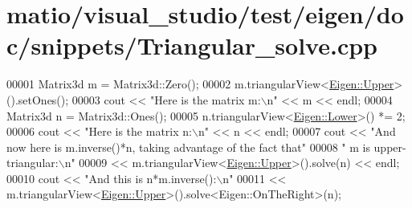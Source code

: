 \hypertarget{matio_2visual__studio_2test_2eigen_2doc_2snippets_2_triangular__solve_8cpp_source}{}\section{matio/visual\+\_\+studio/test/eigen/doc/snippets/\+Triangular\+\_\+solve.cpp}
\label{matio_2visual__studio_2test_2eigen_2doc_2snippets_2_triangular__solve_8cpp_source}

\begin{DoxyCode}
00001 Matrix3d m = Matrix3d::Zero();
00002 m.triangularView<\hyperlink{group__enums_gga39e3366ff5554d731e7dc8bb642f83cda6bcb58be3b8b8ec84859ce0c5ac0aaec}{Eigen::Upper}>().setOnes();
00003 cout << \textcolor{stringliteral}{"Here is the matrix m:\(\backslash\)n"} << m << endl;
00004 Matrix3d n = Matrix3d::Ones();
00005 n.triangularView<\hyperlink{group__enums_gga39e3366ff5554d731e7dc8bb642f83cda891792b8ed394f7607ab16dd716f60e6}{Eigen::Lower}>() *= 2;
00006 cout << \textcolor{stringliteral}{"Here is the matrix n:\(\backslash\)n"} << n << endl;
00007 cout << \textcolor{stringliteral}{"And now here is m.inverse()*n, taking advantage of the fact that"}
00008         \textcolor{stringliteral}{" m is upper-triangular:\(\backslash\)n"}
00009      << m.triangularView<\hyperlink{group__enums_gga39e3366ff5554d731e7dc8bb642f83cda6bcb58be3b8b8ec84859ce0c5ac0aaec}{Eigen::Upper}>().solve(n) << endl;
00010 cout << \textcolor{stringliteral}{"And this is n*m.inverse():\(\backslash\)n"}
00011      << m.triangularView<\hyperlink{group__enums_gga39e3366ff5554d731e7dc8bb642f83cda6bcb58be3b8b8ec84859ce0c5ac0aaec}{Eigen::Upper}>().solve<Eigen::OnTheRight>(n);
\end{DoxyCode}
